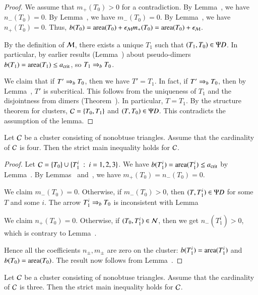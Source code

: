 \begin{proof}  
  We assume that $m_+(T_0)>0$ for a contradiction.  By
  Lemma~, we have $n_-(T_0)=0$.  By
  Lemma~, we have $m_-(T_0)=0$.  By
  Lemma~, we have $n_+(T_0)=0$.  Thus, $b(T_0) =
  {\operatorname{area}}(T_0) + \epsilon_{\mathcal M} m_+(T_0) = {\operatorname{area}}(T_0)+\epsilon_{\mathcal M}$.

  By the definition of $\mathcal M$, there exists a unique $T_1$ such that
  $(T_1,T_0)\in \Psi D$.  In particular, by earlier results
  (Lemma~) about pseudo-dimers
  $b(T_1)={\operatorname{area}}(T_1)\le a_\text{crit}$, so $T_1\Rightarrow_{b} T_0$.

  We claim that if $T'\Rightarrow_{b} T_0$, then we have $T'=T_1$.  In fact, if
  $T'\Rightarrow_{b} T_0$, then by Lemma~, $T'$ is subcritical.
  This follows from the uniqueness of $T_1$ and the disjointness from
  dimers (Theorem~).  In particular, $T=T_1$.  By the
  structure theorem for clusters, $\mathcal C = \{T_0,T_1\}$ and
  $(T,T_0)\in\Psi D$.  This contradicts the assumption of the lemma.
\end{proof}

\begin{lemma}
  Let $\mathcal C$ be a cluster consisting of nonobtuse triangles.  Assume
  that the cardinality of $\mathcal C$ is four.  Then the strict main
  inequality holds for $\mathcal C$.
\end{lemma}

\begin{proof}  
  Let $\mathcal C = \{T_0\}\cup \{T_1^i \ :\  i=1,2,3\}$.  We have $b(T_1^i) =
  {\operatorname{area}}(T_1^i)\le a_\text{crit}$ by Lemma~.  By
  Lemmas~ and~, we have
  $m_+(T_0)=n_-(T_0)=0$.

  We claim $m_-(T_0)=0$.  Otherwise, if $m_-(T_0) >0$, then
  $(T,T_1^i)\in\Psi D$ for some $T$ and some $i$.  The arrow $T_1^i\Rightarrow_{b}
  T_0$ is inconsistent with Lemma~

  We claim $n_+(T_0)=0$.  Otherwise, if $(T_0,T_1^i)\in\mathcal N$, then we
  get $n_-(T_1^i)>0$, which is contrary to Lemma~.

  Hence all the coefficients $n_\pm,m_\pm$ are zero on the cluster:
  $b(T_1^i)={\operatorname{area}}(T_1^i)$ and $b(T_0) = {\operatorname{area}}(T_0)$.  The result now
  follows from Lemma~.
\end{proof}

\begin{lemma}
  Let $\mathcal C$ be a cluster consisting of nonobtuse triangles.  Assume
  that the cardinality of $\mathcal C$ is three.  Then the strict main
  inequality holds for $\mathcal C$.
\end{lemma}

